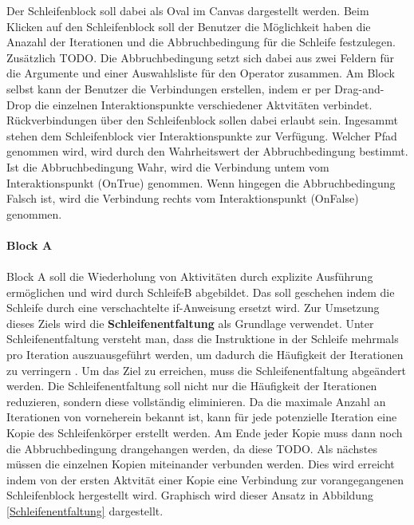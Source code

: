\documentclass{article}
\begin{document}
    \noindent
    Der Schleifenblock soll dabei als Oval im Canvas dargestellt werden.
    Beim Klicken auf den Schleifenblock soll der Benutzer die Möglichkeit haben die Anazahl der Iterationen und die Abbruchbedingung für die Schleife festzulegen.
    Zusätzlich TODO.
    Die Abbruchbedingung setzt sich dabei aus zwei Feldern für die Argumente und einer Auswahlsliste für den Operator zusammen.
    Am Block selbst kann der Benutzer die Verbindungen erstellen, indem er per Drag-and-Drop die einzelnen Interaktionspunkte verschiedener Aktvitäten verbindet.
    Rückverbindungen über den Schleifenblock sollen dabei erlaubt sein.
    Ingesammt stehen dem Schleifenblock vier Interaktionspunkte zur Verfügung.
    Welcher Pfad genommen wird, wird durch den Wahrheitswert der Abbruchbedingung bestimmt.
    Ist die Abbruchbedingung Wahr, wird die Verbindung untem vom Interaktionspunkt (OnTrue) genommen.
    Wenn hingegen die Abbruchbedingung Falsch ist, wird die Verbindung rechts vom Interaktionspunkt (OnFalse) genommen.\\
    \\
    \textbf{Block A}\\
    \\
    Block A soll die Wiederholung von Aktivitäten durch explizite Ausführung ermöglichen und wird durch SchleifeB abgebildet.
    Das soll geschehen indem die Schleife durch eine verschachtelte if-Anweisung ersetzt wird.
    Zur Umsetzung dieses Ziels wird die \textbf{Schleifenentfaltung} als Grundlage verwendet.
    Unter Schleifenentfaltung versteht man, dass die Instruktione in der Schleife mehrmals pro Iteration auszuausgeführt werden, um dadurch die Häufigkeit der Iterationen zu verringern \cite{9}.
    Um das Ziel zu erreichen, muss die Schleifenentfaltung abgeändert werden.
    Die Schleifenentfaltung soll nicht nur die Häufigkeit der Iterationen reduzieren, sondern diese vollständig eliminieren.
    Da die maximale Anzahl an Iterationen von vorneherein bekannt ist, kann für jede potenzielle Iteration eine Kopie des Schleifenkörper erstellt werden. 
    Am Ende jeder Kopie muss dann noch die Abbruchbedingung drangehangen werden, da diese TODO.
    Als nächstes müssen die einzelnen Kopien miteinander verbunden werden.
    Dies wird erreicht indem von der ersten Aktvität einer Kopie eine Verbindung zur vorangegangenen Schleifenblock hergestellt wird.
    Graphisch wird dieser Ansatz in Abbildung \ref{Schleifenentfaltung} dargestellt.
\end{document}

